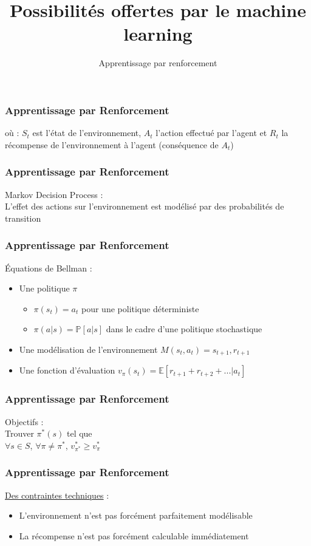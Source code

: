 \documentclass{formation}
\title{Possibilités offertes par le machine learning}
\subtitle{Apprentissage par renforcement}
\begin{document}
\maketitle

\begin{frame}
  \frametitle{Apprentissage par Renforcement}
  où :
  \newline
  $S_t$ est l'état de l'environnement,
  \newline
  $A_t$ l'action effectué par l'agent et
  \newline
  $R_t$ la récompense de l'environnement à l'agent (conséquence de $A_t$)
\end{frame}

\begin{frame}
  \frametitle{Apprentissage par Renforcement}
  Markov Decision Process :\\
  \newline
  L'effet des actions sur l'environnement est modélisé par des probabilités de transition
\end{frame}

\begin{frame}
  \frametitle{Apprentissage par Renforcement}
  Équations de Bellman : 
  \begin{itemize}
  \item Une politique \textbf{$\pi$} 
    \begin{itemize}
    \item $\pi(s_t) = a_t$ pour une politique déterministe
    \item $\pi(a | s) = \mathbb{P}[a|s]$ dans le cadre d'une politique stochastique
    \end{itemize}
  \item Une modélisation de l'environnement \textbf{$M(s_t,a_t)=s_{t+1},r_{t+1}$}
  \item Une fonction d'évaluation \textbf{$v_{\pi}(s_t)$}$ = \mathbb{E}[r_{t+1}+r_{t+2}+...|a_t]$
  \end{itemize}
\end{frame}

\begin{frame}
  \frametitle{Apprentissage par Renforcement}
  Objectifs : \\
  Trouver $\pi^*(s)$ tel que\\
  $\forall s \in S$, $\forall \pi \neq \pi^*$, $v^*_{\pi^*} \geq v^*_{\pi}$
\end{frame}

\begin{frame}
  \frametitle{Apprentissage par Renforcement}
  \underline{Des contraintes techniques} :
  \begin{itemize}
  \item L'environnement n'est pas forcément parfaitement modélisable
  \item La récompense n'est pas forcément calculable immédiatement
  \end{itemize}
\end{frame}
\end{document}
